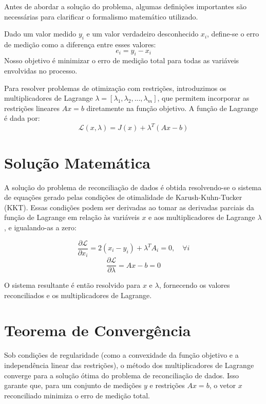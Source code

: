 Antes de abordar a solução do problema, algumas definições importantes são necessárias para clarificar o formalismo matemático utilizado.

\begin{definicao}
Dado um valor medido $y_i$ e um valor verdadeiro desconhecido $x_i$, define-se o erro de medição como a diferença entre esses valores:
\[
e_i = y_i - x_i
\]
Nosso objetivo é minimizar o erro de medição total para todas as variáveis envolvidas no processo.
\end{definicao}

\begin{definicao}
Para resolver problemas de otimização com restrições, introduzimos os multiplicadores de Lagrange $\lambda = [\lambda_1, \lambda_2, ..., \lambda_m]$, que permitem incorporar as restrições lineares $Ax = b$ diretamente na função objetivo. A função de Lagrange é dada por:
\[
\mathcal{L}(x, \lambda) = J(x) + \lambda^T(Ax - b)
\]
\end{definicao}

\section{Solução Matemática}
\label{Sec:SolucaoMatematica}

A solução do problema de reconciliação de dados é obtida resolvendo-se o sistema de equações gerado pelas condições de otimalidade de Karush-Kuhn-Tucker (KKT). Essas condições podem ser derivadas ao tomar as derivadas parciais da função de Lagrange em relação às variáveis $x$ e aos multiplicadores de Lagrange $\lambda$, e igualando-as a zero:

\[
\frac{\partial \mathcal{L}}{\partial x_i} = 2(x_i - y_i) + \lambda^T A_i = 0, \quad \forall i
\]
\[
\frac{\partial \mathcal{L}}{\partial \lambda} = Ax - b = 0
\]

O sistema resultante é então resolvido para $x$ e $\lambda$, fornecendo os valores reconciliados e os multiplicadores de Lagrange.

\section{Teorema de Convergência}
\label{Sec:TeoremaConvergencia}

\begin{teorema}
Sob condições de regularidade (como a convexidade da função objetivo e a independência linear das restrições), o método dos multiplicadores de Lagrange converge para a solução ótima do problema de reconciliação de dados. Isso garante que, para um conjunto de medições $y$ e restrições $Ax = b$, o vetor $x$ reconciliado minimiza o erro de medição total.
\end{teorema}

